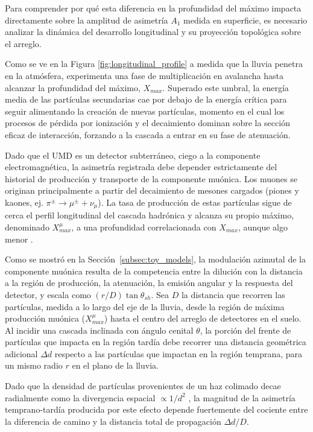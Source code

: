 Para comprender por qué esta diferencia en la profundidad del máximo impacta directamente sobre la amplitud de asimetría $A_{1}$ medida en superficie, es necesario analizar la dinámica del desarrollo longitudinal y su proyección topológica sobre el arreglo.

Como se ve en la Figura \ref{fig:longitudinal_profile} a medida que la lluvia penetra en la atmósfera, experimenta una fase de multiplicación en avalancha hasta alcanzar la profundidad del máximo, $X_{max}$. Superado este umbral, la energía media de las partículas secundarias cae por debajo de la energía crítica para seguir alimentando la creación de nuevas partículas, momento en el cual los procesos de pérdida por ionización y el decaimiento dominan sobre la sección eficaz de interacción, forzando a la cascada a entrar en su fase de atenuación.

Dado que el UMD es un detector subterráneo, ciego a la componente electromagnética, la asimetría registrada debe depender estrictamente del historial de producción y transporte de la componente muónica. Los muones se originan principalmente a partir del decaimiento de mesones cargados (piones y kaones, ej. $\pi^{\pm} \rightarrow \mu^{\pm} + \nu_{\mu}$). La tasa de producción de estas partículas sigue de cerca el perfil longitudinal del cascada hadrónica y alcanza su propio máximo, denominado $X_{max}^{\mu}$, a una profundidad correlacionada con $X_{max}$, aunque algo menor \cite{Cazon2012}.

Como se mostró en la Sección~\ref{subsec:toy_models}, la modulación azimutal de la componente muónica resulta de la competencia entre la dilución con la distancia a la región de producción, la atenuación, la emisión angular y la respuesta del detector, y escala como $(r/D)\tan\theta_{sh}$. Sea $D$ la distancia que recorren las partículas, medida a lo largo del eje de la lluvia, desde la región de máxima producción muónica ($X_{max}^{\mu}$) hasta el centro del arreglo de detectores en el suelo. Al incidir una cascada inclinada con ángulo cenital $\theta$, la porción del frente de partículas que impacta en la región tardía debe recorrer una distancia geométrica adicional $\Delta d$ respecto a las partículas que impactan en la región temprana, para un mismo radio $r$ en el plano de la lluvia.

Dado que la densidad de partículas provenientes de un haz colimado decae radialmente como la divergencia espacial  $\propto 1/d^2$ \cite{Cazon2012}, la magnitud de la asimetría temprano-tardía producida por este efecto depende fuertemente del cociente entre la diferencia de camino y la distancia total de propagación $\Delta d / D$.

